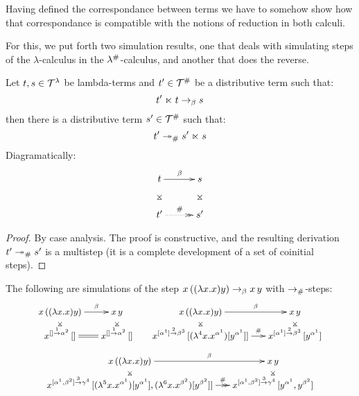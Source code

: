 Having defined the correspondance between terms we
have to somehow show how that correspondance is compatible with the notions
of reduction in both calculi.

For this, we put forth two simulation results, one that deals with simulating steps
of the $\lambda$-calculus in the $\lambda^{\mathtt{\#}}$-calculus, and another that does the
reverse.

\begin{proposition}[Simulation]
Let $t,s \in \mathcal{T}^{\lambda}$ be lambda-terms and $t' \in \mathcal{T}^{\mathtt{\#}}$ be a distributive term such that:
\[
  t' \mathrel{\ltimes} t \mathrel{\to_\beta} s
\]
then there is a distributive term $s' \in \mathcal{T}^{\mathtt{\#}}$ such that:
\[
  t' \mathrel{\twoheadrightarrow_{\mathtt{\#}}} s' \mathrel{\ltimes} s
\]
Diagramatically:
\[
\xymatrix@C=1cm{
 \tm \ar@{}[d]|*=0[@]{\rtimes} \ar[r]^{\beta} & \tmtwo \ar@{}[d]|*=0[@]{\rtimes} \\
 \tm' \ar@{.>>}[r]^{\dist} & \tmtwo' \\
}
\]
\end{proposition}
\begin{proof}
 By case analysis.
The proof is constructive, and the resulting derivation $t' \mathrel{\twoheadrightarrow_{\mathtt{\#}}} s'$ is
a multistep (it is a complete development of a set of coinitial steps).
\end{proof}

\begin{example}
The following are simulations of the step $x\,((\lambda x. x)y) \mathrel{\to_\beta} x\,y$
with $\mathrel{\to_{\mathtt{\#}}}$-steps:
\[
  {\small
    \xymatrix@R=.25cm@C=.5cm{
      \var\,((\lam{\var}{\var})\vartwo)
      \ar[r]^-{\beta}
      \ar@{}[d]|*=0[@]{\rtimes}
      &
      \var\,\vartwo
      \ar@{}[d]|*=0[@]{\rtimes}
    \\
      \var^{[] \tolab{1} \alpha^2}\,[]
      \ar@{=}[r]
      &
      \var^{[] \tolab{1} \alpha^2}\,[]
    }
    \HS
    \xymatrix@R=.25cm@C=.5cm{
      \var\,((\lam{\var}{\var})\vartwo)
      \ar[r]^-{\beta}
      \ar@{}[d]|*=0[@]{\rtimes}
      &
      \var\,\vartwo
      \ar@{}[d]|*=0[@]{\rtimes}
    \\
      \var^{[\alpha^1] \tolab{2} \beta^3}\,[(\lamp{4}{\var}{\var^{\alpha^1}})[\vartwo^{\alpha^1}]]
      \ar[r]^-{\dist}
      &
      \var^{[\alpha^1] \tolab{2} \beta^3}\,[\vartwo^{\alpha^1}]
    }
  }
\]
\[
  {\small
    \xymatrix@R=.25cm@C=.5cm{
      \var\,((\lam{\var}{\var})\vartwo)
      \ar[r]^-{\beta}
      \ar@{}[d]|*=0[@]{\rtimes}
      &
      \var\,\vartwo
      \ar@{}[d]|*=0[@]{\rtimes}
    \\
      \var^{[\alpha^1,\beta^2] \tolab{3} \gamma^4}\,[
        (\lamp{5}{\var}{\var^{\alpha^1}})[\vartwo^{\alpha^1}],
        (\lamp{6}{\var}{\var^{\beta^2}})[\vartwo^{\beta^2}]
      ]
      \ar@{->>}[r]^-{\dist}
      &
      \var^{[\alpha^1,\beta^2] \tolab{3} \gamma^4}\,[
        \vartwo^{\alpha^1},
        \vartwo^{\beta^2}
      ]
    }
  }
\]
\end{example}

